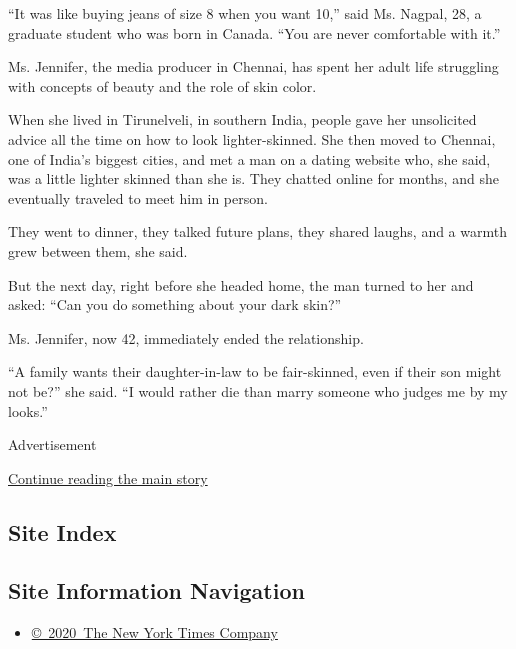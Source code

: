 ``It was like buying jeans of size 8 when you want 10,'' said Ms.
Nagpal, 28, a graduate student who was born in Canada. ``You are never
comfortable with it.''

Ms. Jennifer, the media producer in Chennai, has spent her adult life
struggling with concepts of beauty and the role of skin color.

When she lived in Tirunelveli, in southern India, people gave her
unsolicited advice all the time on how to look lighter-skinned. She then
moved to Chennai, one of India's biggest cities, and met a man on a
dating website who, she said, was a little lighter skinned than she is.
They chatted online for months, and she eventually traveled to meet him
in person.

They went to dinner, they talked future plans, they shared laughs, and a
warmth grew between them, she said.

But the next day, right before she headed home, the man turned to her
and asked: ``Can you do something about your dark skin?''

Ms. Jennifer, now 42, immediately ended the relationship.

``A family wants their daughter-in-law to be fair-skinned, even if their
son might not be?'' she said. ``I would rather die than marry someone
who judges me by my looks.''

Advertisement

\protect\hyperlink{after-bottom}{Continue reading the main story}

\hypertarget{site-index}{%
\subsection{Site Index}\label{site-index}}

\hypertarget{site-information-navigation}{%
\subsection{Site Information
Navigation}\label{site-information-navigation}}

\begin{itemize}
\tightlist
\item
  \href{https://help.nytimes.com/hc/en-us/articles/115014792127-Copyright-notice}{©~2020~The
  New York Times Company}
\end{itemize}

